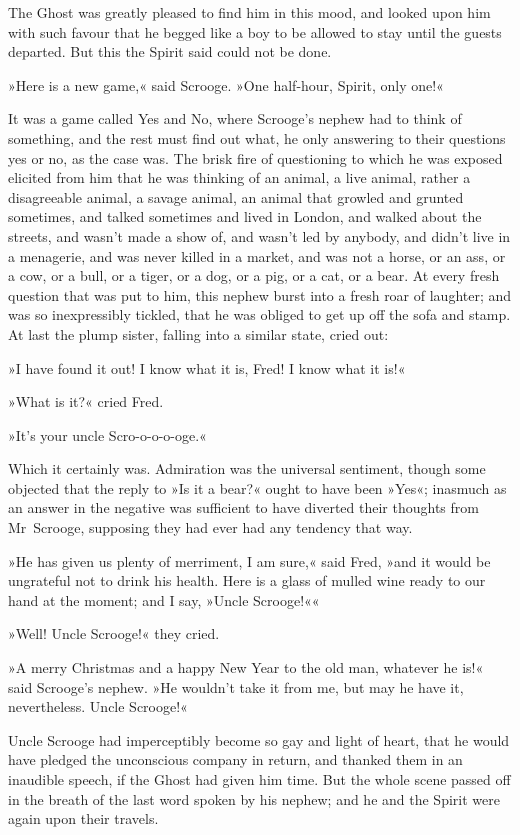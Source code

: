 The Ghost was greatly pleased to find him in this mood, and looked upon him with such favour that he begged like a boy to be allowed to stay until the guests departed. But this the Spirit said could not be done.

»Here is a new game,« said Scrooge. »One half-hour, Spirit, only one!«

It was a game called Yes and No, where Scrooge's nephew had to think of something, and the rest must find out what, he only answering to their questions yes or no, as the case was. The brisk fire of questioning to which he was exposed elicited from him that he was thinking of an animal, a live animal, rather a disagreeable animal, a savage animal, an animal that growled and grunted sometimes, and talked sometimes and lived in London, and walked about the streets, and wasn't made a show of, and wasn't led by anybody, and didn't live in a menagerie, and was never killed in a market, and was not a horse, or an ass, or a cow, or a bull, or a tiger, or a dog, or a pig, or a cat, or a bear. At every fresh question that was put to him, this nephew burst into a fresh roar of laughter; and was so inexpressibly tickled, that he was obliged to get up off the sofa and stamp. At last the plump sister, falling into a similar state, cried out:

»I have found it out! I know what it is, Fred! I know what it is!«

»What is it?« cried Fred.

»It's your uncle Scro-o-o-o-oge.«

Which it certainly was. Admiration was the universal sentiment, though some objected that the reply to »Is it a bear?« ought to have been »Yes«; inasmuch as an answer in the negative was sufficient to have diverted their thoughts from Mr~Scrooge, supposing they had ever had any tendency that way.

»He has given us plenty of merriment, I am sure,« said Fred, »and it would be ungrateful not to drink his health. Here is a glass of mulled wine ready to our hand at the moment; and I say, »Uncle Scrooge!««

»Well! Uncle Scrooge!« they cried.

»A merry Christmas and a happy New Year to the old man, whatever he is!« said Scrooge's nephew. »He wouldn't take it from me, but may he have it, nevertheless. Uncle Scrooge!«

Uncle Scrooge had imperceptibly become so gay and light of heart, that he would have pledged the unconscious company in return, and thanked them in an inaudible speech, if the Ghost had given him time. But the whole scene passed off in the breath of the last word spoken by his nephew; and he and the Spirit were again upon their travels.

